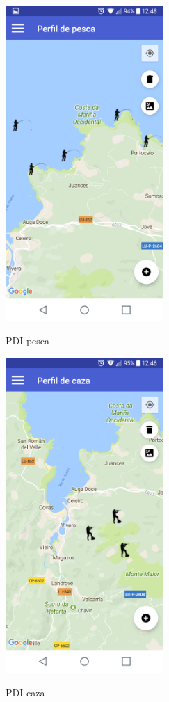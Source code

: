 \begin{figure}[htbp]
\begin{minipage}[b]{0.5\linewidth} %
\centering
\includegraphics[width=6cm]{capturamovil/pdipesca.png}
 \label{figura1}
\caption{PDI pesca}

\end{minipage}
\hspace{0.5cm} %
\begin{minipage}[b]{0.5\linewidth}
\centering
\includegraphics[width=6cm]{capturamovil/pdicaza.png}
 \label{figura2}
\caption{PDI caza}

\end{minipage}
\end{figure}




